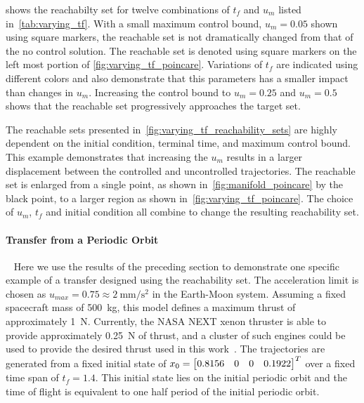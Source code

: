  shows the reachabilty set for twelve combinations of \(t_f\) and \( u_m\) listed in~\cref{tab:varying_tf}.
With a small maximum control bound, \( u_m = \num{0.05} \) shown using square markers, the reachable set is not dramatically changed from that of the no control solution.
The reachable set is denoted using square markers on the left most portion of \cref{fig:varying_tf_poincare}.
Variations of \( t_f\) are indicated using different colors and also demonstrate that this parameters has a smaller impact than changes in \( u_m \).
Increasing the control bound to \( u_m = \num{0.25} \) and \( u_m = \num{0.5} \) shows that the reachable set progressively approaches the target set.

The reachable sets presented in~\cref{fig:varying_tf_reachability_sets} are highly dependent on the initial condition, terminal time, and maximum control bound. 
This example demonstrates that increasing the \( u_m \) results in a larger displacement between the controlled and uncontrolled trajectories.
The reachable set is enlarged from a single point, as shown in~\cref{fig:manifold_poincare} by the black point, to a larger region as shown in~\cref{fig:varying_tf_poincare}.
The choice of \( u_m\), \( t_f \) and initial condition all combine to change the resulting reachability set. 

\paragraph{Transfer from a Periodic Orbit}~\label{sssec:periodic_orbit_transfer}
Here we use the results of the preceding section to demonstrate one specific example of a transfer designed using the reachability set.
The acceleration limit is chosen as  \( u_{max} = 0.75 \approx \SI{2}{\milli\meter\per\second\squared} \) in the Earth-Moon system.
Assuming a fixed spacecraft mass of \SI{500}{\kilo\gram}, this model defines a maximum thrust of approximately \SI{1}{\newton}.
Currently, the NASA NEXT xenon thruster is able to provide approximately \SI{0.25}{\newton} of thrust, and a cluster of such engines could be used to provide the desired thrust used in this work~\cite{schmidt2008}.
The trajectories are generated from a fixed initial state of \( x_0 = \begin{bmatrix}0.8156 & 0 & 0 & 0.1922 \end{bmatrix}^T \) over a fixed time span of \( t_f = 1.4 \).
This initial state lies on the initial periodic orbit and the time of flight is equivalent to one half period of the initial periodic orbit. 

